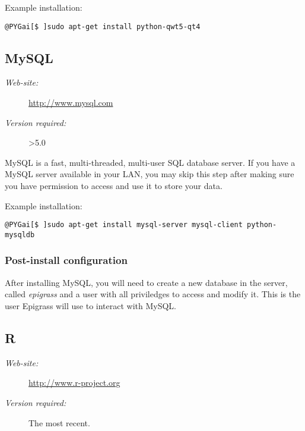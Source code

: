 \documentclass[a4paper,10pt]{manual}
\begin{document}
Example installation:

\begin{Verbatim}[commandchars=@\[\]]
@PYGai[$ ]sudo apt-get install python-qwt5-qt4
\end{Verbatim}


\subsection{MySQL}
\begin{description}
\item[\emph{Web-site:}]
\href{http://www.mysql.com}{http://www.mysql.com}

\item[\emph{Version required:}]
\textgreater{}5.0

\end{description}

MySQL is a fast, multi-threaded, multi-user SQL database server. If you have a MySQL server available in your LAN, you may skip this step after making sure you have permission to access and use it to store your data.

Example installation:

\begin{Verbatim}[commandchars=@\[\]]
@PYGai[$ ]sudo apt-get install mysql-server mysql-client python-mysqldb
\end{Verbatim}


\subsubsection{Post-install configuration}

After installing MySQL, you will need to create a new database in the server, called \emph{epigrass} and a user with all priviledges to access and modify it. This is the user Epigrass will use to interact with MySQL.


\subsection{R}
\begin{description}
\item[\emph{Web-site:}]
\href{http://www.r-project.org}{http://www.r-project.org}

\item[\emph{Version required:}]
The most recent.

\end{description}
\end{document}
